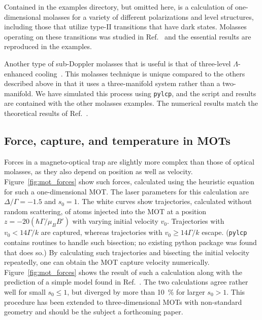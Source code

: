 \documentclass[final,5p,times,twocolumn]{elsarticle}
\begin{document}
Contained in the examples directory, but omitted here, is a calculation of one-dimensional molasses for a variety of different polarizations and level structures, including those that utilize type-II transitions that have dark states.  Molasses operating on these transitions was studied in Ref.~\cite{Devlin2016} and the essential results are reproduced in the examples.

Another type of sub-Doppler molasses that is useful is that of three-level $\Lambda$-enhanced cooling~\cite{Grier2013}.  This molasses technique is unique compared to the others described above in that it uses a three-manifold system rather than a two-manifold.  We have simulated this process using {\tt pylcp}, and the script and results are contained with the other molasses examples.  The numerical results match the theoretical results of Ref.~\cite{Grier2013}.

\subsection{Force, capture, and temperature in MOTs}


Forces in a magneto-optical trap are slightly more complex than those of optical molasses, as they also depend on position as well as velocity.  Figure~\ref{fig:mot_forces} show such forces, calculated using the heuristic equation for such a one-dimensional MOT.  The laser parameters for this calculation are $\Delta/\Gamma=-1.5$ and $s_0=1$.  The white curves show trajectories, calculated without random scattering, of atoms injected into the MOT at a position $z=-20(\hbar \Gamma/\mu_B B')$ with varying initial velocity $v_0$.  Trajectories with $v_0 < 14\Gamma/k$ are captured, whereas trajectories with $v_0\geq 14 \Gamma/k$ escape.  ({\tt pylcp} contains routines to handle such bisection; no existing python package was found that does so.)  By calculating such trajectories and bisecting the initial velocity repeatedly, one can obtain the MOT capture velocity numerically.  Figure~\ref{fig:mot_forces} shows the result of such a calculation along with the prediction of a simple model found in Ref.~\cite{Haubrich1993}.  The two calculations agree rather well for small $s_0\leq 1$, but diverged by more than 10~\% for larger $s_0>1$.  This procedure has been extended to three-dimensional MOTs with non-standard geometry and should be the subject a forthcoming paper.
\end{document}
